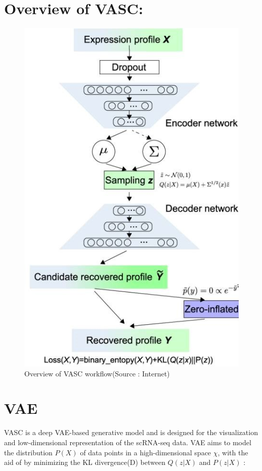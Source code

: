 \documentclass[12 pts]{article}
\begin{document}
\section{Overview of VASC:}
\begin{figure}[H]
\centering
\includegraphics[scale=0.9]{Figure1}
\caption{Overview of VASC workflow(Source : Internet)}
\label{fig: Overview of VASC workflow}
\end{figure}
\clearpage


\section{VAE}
VASC is a deep VAE-based generative model and is designed for the visualization and low-dimensional representation of the scRNA-seq data. VAE aims to model the distribution $P(X)$ of data points in a high-dimensional space $\chi$, with the aid of by minimizing the KL divergence(D) between $Q(z|X)$ and $P(z|X)$ :
\end{document}
